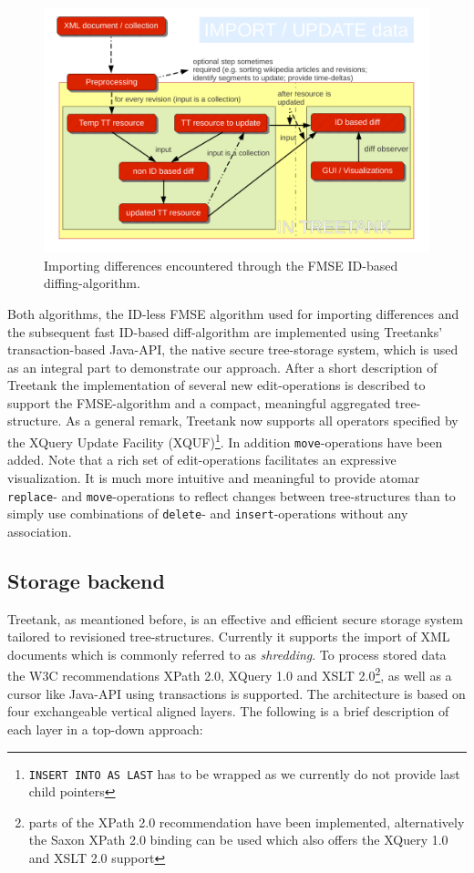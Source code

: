 \begin{figure}[tb]
\centering
\includegraphics[width=\textwidth]{figures/importdata}
\caption{Importing differences encountered through the FMSE ID-based diffing-algorithm.} 
\label{fig:importdata}
\end{figure}

Both algorithms, the ID-less FMSE algorithm used for importing differences and the subsequent fast ID-based diff-algorithm are implemented using Treetanks' transaction-based Java-API, the native secure tree-storage system, which is used as an integral part to demonstrate our approach. After a short description of Treetank the implementation of several new edit-operations is described to support the FMSE-algorithm and a compact, meaningful aggregated tree-structure. As a general remark, Treetank now supports all operators specified by the XQuery Update Facility (XQUF)\footnote{\texttt{INSERT INTO AS LAST} has to be wrapped as we currently do not provide last child pointers}. In addition \texttt{move}-operations have been added. Note that a rich set of edit-operations facilitates an expressive visualization. It is much more intuitive and meaningful to provide atomar \texttt{replace}- and \texttt{move}-operations to reflect changes between tree-structures than to simply use combinations of \texttt{delete}- and \texttt{insert}-operations without any association. 

\subsection{Storage backend}
Treetank, as meantioned before, is an effective and efficient secure storage system tailored to revisioned tree-structures. Currently it supports the import of XML documents which is commonly referred to as \emph{shredding}. To process stored data the W3C recommendations XPath 2.0, XQuery 1.0 and XSLT 2.0\footnote{parts of the XPath 2.0 recommendation have been implemented, alternatively the Saxon XPath 2.0 binding can be used which also offers the XQuery 1.0 and XSLT 2.0 support}, as well as a cursor like Java-API using transactions is supported. The architecture is based on four exchangeable vertical aligned layers. The following is a brief description of each layer in a top-down approach:


